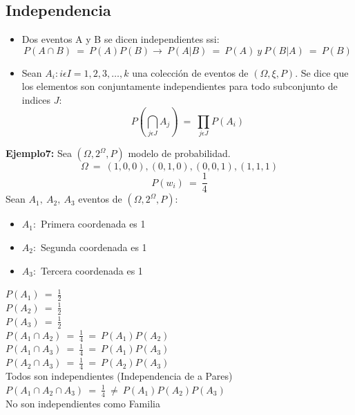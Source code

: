 \subsection{Independencia}
	\begin{itemize}
		\item Dos eventos A y B se dicen independientes ssi:
		$$P(A\cap B)\ =\ P(A)P(B) \rightarrow\ P(A|B)\ =\ P(A)\ y\ P(B|A)\ =\ P(B)$$
		\item Sean ${A_{i}:i\epsilon I={1,2,3,\ldots,k}}$ una colecci\'on de eventos de
		 $(\Omega,\xi,P)$. Se dice que los elementos son conjuntamente independientes 
		 para todo subconjunto de indices $J$:
		$$P(\bigcap_{j\epsilon J}A_{j})\ =\ \prod_{j\epsilon J}P(A_{i})$$
	\end{itemize}
	\textbf{Ejemplo7:} Sea $(\Omega,2^{\Omega},P)$ modelo de probabilidad.
		$$\Omega\ =\ {(1,0,0),(0,1,0),(0,0,1),(1,1,1)}$$
		$$P({w_{i}})\ =\ \frac{1}{4}$$
		Sean $A_{1},\ A_{2},\ A_{3}$ eventos de $(\Omega,2^{\Omega},P)$:\\
		\begin{itemize}
			\item $A_{1}:$ Primera coordenada es 1
			\item $A_{2}:$ Segunda coordenada es 1
			\item $A_{3}:$ Tercera coordenada es 1
		\end{itemize}
		$P(A_{1})\ =\ \frac{1}{2}$\\
		$P(A_{2})\ =\ \frac{1}{2}$\\
		$P(A_{3})\ =\ \frac{1}{2}$\\
		$P(A_{1}\cap A_{2})\ =\ \frac{1}{4}\ =\ P(A_{1})P(A_{2})$\\			
		$P(A_{1}\cap A_{3})\ =\ \frac{1}{4}\ =\ P(A_{1})P(A_{3})$\\			
		$P(A_{2}\cap A_{3})\ =\ \frac{1}{4}\ =\ P(A_{2})P(A_{3})$\\
		Todos son independientes (Independencia de a Pares)\\
		$P(A_{1}\cap A_{2}\cap A_{3})\ =\ \frac{1}{4}\ \neq\ P(A_{1})P(A_{2})P(A_{3})$\\
		No son independientes como Familia\\
